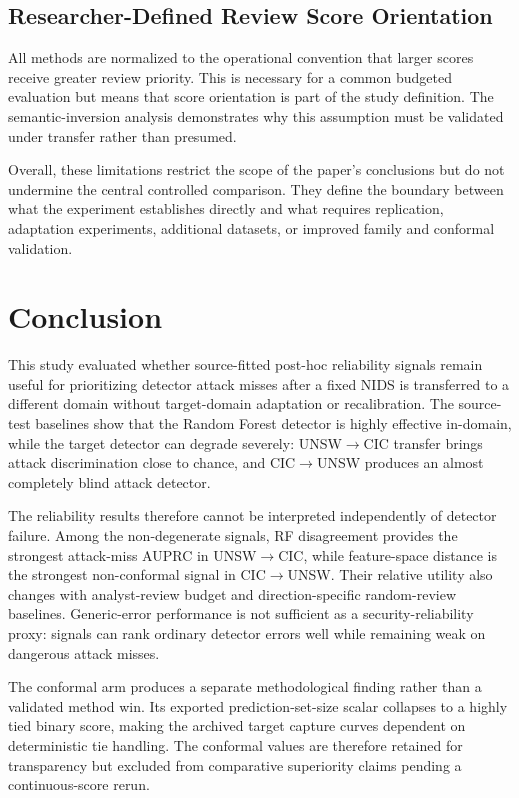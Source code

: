 \documentclass[conference]{IEEEtran}
\begin{document}
\subsection{Researcher-Defined Review Score Orientation}

All methods are normalized to the operational convention that larger scores receive greater review priority. This is necessary for a common budgeted evaluation but means that score orientation is part of the study definition. The semantic-inversion analysis demonstrates why this assumption must be validated under transfer rather than presumed.

Overall, these limitations restrict the scope of the paper's conclusions but do not undermine the central controlled comparison. They define the boundary between what the experiment establishes directly and what requires replication, adaptation experiments, additional datasets, or improved family and conformal validation.

\section{Conclusion}

This study evaluated whether source-fitted post-hoc reliability signals remain useful for prioritizing detector attack misses after a fixed NIDS is transferred to a different domain without target-domain adaptation or recalibration. The source-test baselines show that the Random Forest detector is highly effective in-domain, while the target detector can degrade severely: UNSW$\rightarrow$CIC transfer brings attack discrimination close to chance, and CIC$\rightarrow$UNSW produces an almost completely blind attack detector.

The reliability results therefore cannot be interpreted independently of detector failure. Among the non-degenerate signals, RF disagreement provides the strongest attack-miss AUPRC in UNSW$\rightarrow$CIC, while feature-space distance is the strongest non-conformal signal in CIC$\rightarrow$UNSW. Their relative utility also changes with analyst-review budget and direction-specific random-review baselines. Generic-error performance is not sufficient as a security-reliability proxy: signals can rank ordinary detector errors well while remaining weak on dangerous attack misses.

The conformal arm produces a separate methodological finding rather than a validated method win. Its exported prediction-set-size scalar collapses to a highly tied binary score, making the archived target capture curves dependent on deterministic tie handling. The conformal values are therefore retained for transparency but excluded from comparative superiority claims pending a continuous-score rerun.
\end{document}
